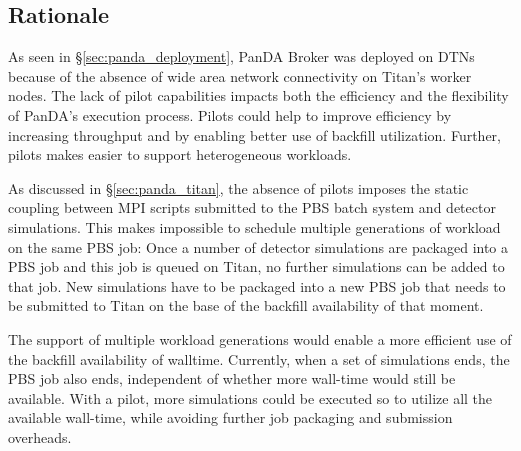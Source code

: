 
\subsection{Rationale} 


As seen in \S\ref{sec:panda_deployment}, PanDA Broker was deployed on DTNs
because of the absence of wide area network connectivity on Titan's worker
nodes. The lack of pilot capabilities impacts both the efficiency and the
flexibility of PanDA's execution process. Pilots could help to improve
efficiency by increasing throughput and by enabling better use of backfill
utilization. Further, pilots makes easier to support heterogeneous workloads.

As discussed in \S\ref{sec:panda_titan}, the absence of pilots imposes the
static coupling between MPI scripts submitted to the PBS batch system and
detector simulations. This makes impossible to schedule multiple generations of
workload on the same PBS job: Once a number of detector simulations are packaged
into a PBS job and this job is queued on Titan, no further simulations can be
added to that job. New simulations have to be packaged into a new PBS job that
needs to be submitted to Titan on the base of the backfill availability of that
moment.

The support of  multiple workload generations would enable a more efficient
use of the backfill availability of walltime. Currently, when a set of
simulations ends, the PBS job also ends, independent of whether more wall-time
would still be available. With a pilot, more simulations could be executed so
to utilize all the available wall-time, while avoiding further job packaging
and submission overheads.


